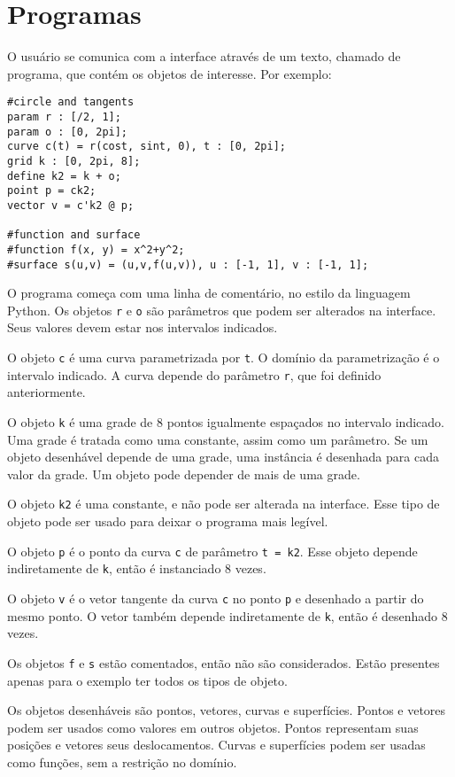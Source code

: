 \chapter{Programas}

O usuário se comunica com a interface através de um texto, chamado de programa,
que contém os objetos de interesse.
Por exemplo:
\begin{lstlisting}[caption=Exemplo de objetos,label=code1]
#circle and tangents
param r : [/2, 1];
param o : [0, 2pi];
curve c(t) = r(cost, sint, 0), t : [0, 2pi];
grid k : [0, 2pi, 8];
define k2 = k + o;
point p = ck2;
vector v = c'k2 @ p;

#function and surface
#function f(x, y) = x^2+y^2;
#surface s(u,v) = (u,v,f(u,v)), u : [-1, 1], v : [-1, 1];
\end{lstlisting}

O programa começa com uma linha de comentário, no estilo da linguagem Python.
Os objetos \texttt{r} e \texttt{o} são parâmetros que podem ser alterados na interface.
Seus valores devem estar nos intervalos indicados.

O objeto \texttt{c} é uma curva parametrizada por \texttt{t}.
O domínio da parametrização é o intervalo indicado.
A curva depende do parâmetro \texttt{r}, que foi definido anteriormente.

O objeto \texttt{k} é uma grade de 8 pontos igualmente espaçados no intervalo indicado.
Uma grade é tratada como uma constante, assim como um parâmetro.
Se um objeto desenhável depende de uma grade, uma instância é desenhada para cada valor da grade.
Um objeto pode depender de mais de uma grade.

O objeto \texttt{k2} é uma constante, e não pode ser alterada na interface.
Esse tipo de objeto pode ser usado para deixar o programa mais legível.

O objeto \texttt{p} é o ponto da curva \texttt{c} de parâmetro \texttt{t = k2}.
Esse objeto depende indiretamente de \texttt{k}, então é instanciado 8 vezes.

O objeto \texttt{v} é o vetor tangente da curva \texttt{c} no ponto \texttt{p}
e desenhado a partir do mesmo ponto.
O vetor também depende indiretamente de \texttt{k}, então é desenhado 8 vezes.

Os objetos \texttt{f} e \texttt{s} estão comentados, então não são considerados.
Estão presentes apenas para o exemplo ter todos os tipos de objeto.

Os objetos desenháveis são pontos, vetores, curvas e superfícies.
Pontos e vetores podem ser usados como valores em outros objetos.
Pontos representam suas posições e vetores seus deslocamentos.
Curvas e superfícies podem ser usadas como funções, sem a restrição no domínio.


